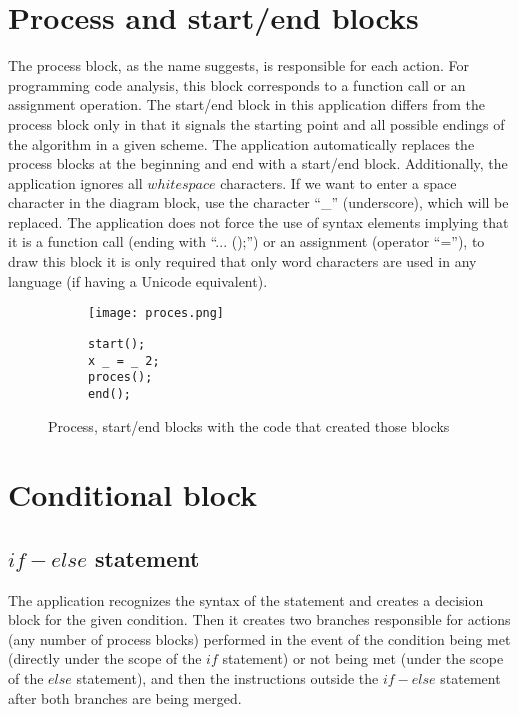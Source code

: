 \section{Process and start/end blocks}
The process block, as the name suggests, is responsible for each action. For programming code analysis, this block corresponds to a function call or an assignment operation. The start/end block in this application differs from the process block only in that it signals the starting point and all possible endings of the algorithm in a given scheme. The application automatically replaces the process blocks at the beginning and end with a start/end block. Additionally, the application ignores all $whitespace$ characters. If we want to enter a space character in the diagram block, use the character ``\_'' (underscore), which will be replaced. The application does not force the use of syntax elements implying that it is a function call (ending with ``... ();'') or an assignment (operator ``=''), to draw this block it is only required that only word characters  are used in any language (if having a Unicode equivalent). 
	
	\begin{figure}[H]
  \begin{subfigure}[t]{0.49\textwidth}
    \vspace{0pt}
    \centering
    \texttt{[image: proces.png]}
  \end{subfigure}\hfill
  \begin{subfigure}[t]{0.49\textwidth}
    \begin{verbatim}
start();
x _ = _ 2;
proces();
end();
    \end{verbatim}
  \end{subfigure}%
  \caption{Process, start/end blocks with the code that created those blocks}
\end{figure}

\section{Conditional block }
  \subsection{$if-else$ statement }	 
	
	  The application recognizes the syntax of the statement and creates a decision block for the given condition. Then it creates two branches responsible for actions (any number of process blocks) performed in the event of the condition being met (directly under the scope of the $if$ statement) or not being met (under the scope of the $else$ statement), and then the instructions outside the $if-else$ statement after both branches are being merged.   
		

